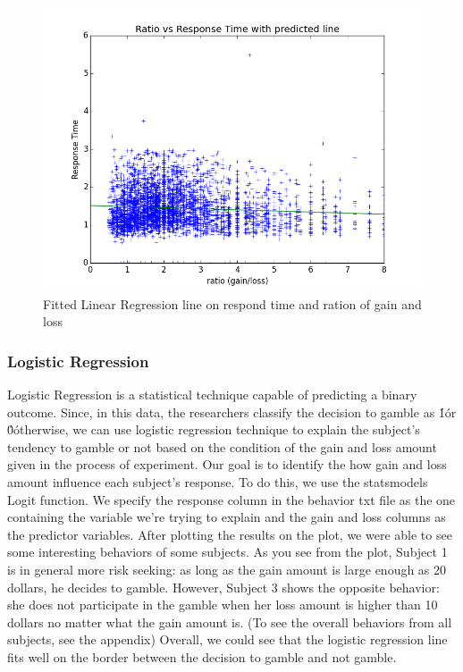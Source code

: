 \begin{figure}[H] 
\centering \includegraphics[scale=0.5]{../fig/lin/linear_regression.png}	 
\caption{Fitted Linear Regression line on respond time and ration of gain and loss}
\end{figure}


\subsubsection {Logistic Regression}
\noindent
 Logistic Regression is a statistical technique capable of predicting a binary outcome. Since, 
in this data, the researchers classify the decision to gamble as \'1\' or \'0\' otherwise, we can 
use logistic regression technique to explain the subject's tendency to gamble or not based on 
the condition of the gain and loss amount given in the process of experiment. Our goal is to 
identify the how gain and loss amount influence each subject's response. To do this, we use 
the statsmodels Logit function. We specify the response column in the behavior txt file as the 
one containing the variable we're trying to explain and the gain and loss columns as the predictor
 variables. After plotting the results on the plot, we were able to see some interesting behaviors
  of some subjects. As you see from the plot, Subject 1 is in general more risk seeking: as long 
  as the gain amount is large enough as 20 dollars, he decides to gamble. However, Subject 3 shows
   the opposite behavior: she does not participate in the gamble when her loss amount is higher 
   than 10 dollars no matter what the gain amount is. (To see the overall behaviors from all subjects,
    see the appendix) Overall, we could see that the logistic regression line fits well on the 
    border between the decision to gamble and not gamble. 

